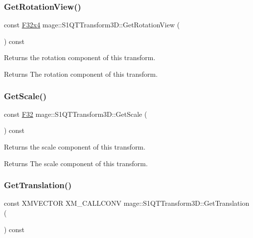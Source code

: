 \subsubsection{\texorpdfstring{Get\+Rotation\+View()}{GetRotationView()}}
{\footnotesize\ttfamily const \mbox{\hyperlink{namespacemage_a851648f37dfb126a2d2f973e102861ad}{F32x4}} mage\+::\+S1\+Q\+T\+Transform3\+D\+::\+Get\+Rotation\+View (\begin{DoxyParamCaption}{ }\end{DoxyParamCaption}) const\hspace{0.3cm}{\ttfamily [noexcept]}}

Returns the rotation component of this transform.

\begin{DoxyReturn}{Returns}
The rotation component of this transform. 
\end{DoxyReturn}
\mbox{\label{classmage_1_1_s1_q_t_transform3_d_a82ef7b135bfe6a05886e0cd0177a05c0}} 
\subsubsection{\texorpdfstring{Get\+Scale()}{GetScale()}}
{\footnotesize\ttfamily const \mbox{\hyperlink{namespacemage_aa97e833b45f06d60a0a9c4fc22ae02c0}{F32}} mage\+::\+S1\+Q\+T\+Transform3\+D\+::\+Get\+Scale (\begin{DoxyParamCaption}{ }\end{DoxyParamCaption}) const\hspace{0.3cm}{\ttfamily [noexcept]}}

Returns the scale component of this transform.

\begin{DoxyReturn}{Returns}
The scale component of this transform. 
\end{DoxyReturn}
\mbox{\label{classmage_1_1_s1_q_t_transform3_d_aa5bedc3630d7c229682fe986b1caf7f2}} 
\subsubsection{\texorpdfstring{Get\+Translation()}{GetTranslation()}}
{\footnotesize\ttfamily const X\+M\+V\+E\+C\+T\+OR X\+M\+\_\+\+C\+A\+L\+L\+C\+O\+NV mage\+::\+S1\+Q\+T\+Transform3\+D\+::\+Get\+Translation (\begin{DoxyParamCaption}{ }\end{DoxyParamCaption}) const\hspace{0.3cm}{\ttfamily [noexcept]}}


